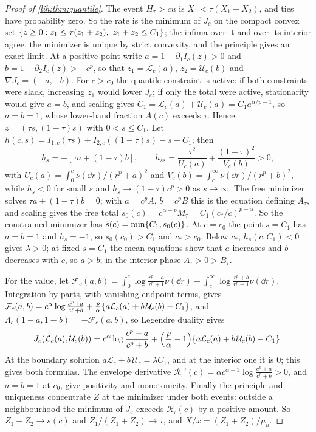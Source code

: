 \begin{proof}[Proof of \cref{lih:thm:quantile}]
The event $H_\tau>cu$ is $X_1<\tau(X_1+X_2)$, and ties have probability zero. So the rate is the minimum of
$J_c$ on the compact convex set $\{z\ge0:z_1\le\tau(z_1+z_2),\ z_1+z_2\le C_1\}$; the infima over it and over its
interior agree, the minimizer is unique by strict convexity, and the principle gives an exact limit.
At a positive point write $a=1-\partial_1I_c(z)>0$ and $b=1-\partial_2I_c(z)>-c^p$, so that $z_1=\mathcal L_c(a)$,
$z_2=\mathcal U_c(b)$ and $\nabla J_c=(-a,-b)$. For $c>c_0$ the quantile constraint is active: if both constraints were
slack, increasing $z_1$ would lower $J_c$; if only the total were active, stationarity would give $a=b$, and
scaling gives $C_1=\mathcal L_c(a)+\mathcal U_c(a)=C_1a^{\alpha/p-1}$, so $a=b=1$, whose lower-band fraction $A(c)$ exceeds $\tau$.
Hence $z=(\tau s,(1-\tau)s)$ with $0<s\le C_1$. Let $h(c,s)=I_{1,c}(\tau s)+I_{2,c}((1-\tau)s)-s+C_1$; then
\[
 h_s=-[\tau a+(1-\tau)b],\qquad h_{ss}=\frac{\tau^2}{U_c(a)}+\frac{(1-\tau)^2}{V_c(b)}>0,
\]
with $U_c(a)=\int_0^c\nu(\dd r)/(r^p+a)^2$ and $V_c(b)=\int_c^\infty\nu(\dd r)/(r^p+b)^2$, while $h_s<0$ for small $s$ and
$h_s\to(1-\tau)c^p>0$ as $s\to\infty$. The free minimizer solves $\tau a+(1-\tau)b=0$; with $a=c^pA$, $b=c^pB$ this is the
equation defining $A_\tau$, and scaling gives the free total $s_0(c)=c^{\alpha-p}M_\tau=C_1(c_*/c)^{p-\alpha}$. So the
constrained minimizer has $\bar s(c)=\min\{C_1,s_0(c)\}$. At $c=c_0$ the point $s=C_1$ has $a=b=1$ and $h_s=-1$, so
$s_0(c_0)>C_1$ and $c_*>c_0$. Below $c_*$, $h_s(c,C_1)<0$ gives $\lambda>0$; at fixed $s=C_1$ the mean equations
show that $a$ increases and $b$ decreases with $c$, so $a>b$; in the interior phase $A_\tau>0>B_\tau$.

For the value, let $\mathcal F_c(a,b)=\int_0^c\log\frac{r^p+a}{r^p+1}\nu(\dd r)+\int_c^\infty\log\frac{r^p+b}{r^p+1}\nu(\dd r)$. Integration by parts,
with vanishing endpoint terms, gives
$\mathcal F_c(a,b)=c^\alpha\log\frac{c^p+a}{c^p+b}+\frac p\alpha\{a\mathcal L_c(a)+b\,\mathcal U_c(b)-C_1\}$, and
$\Lambda_c(1-a,1-b)=-\mathcal F_c(a,b)$, so Legendre duality gives
\[
 J_c(\mathcal L_c(a),\mathcal U_c(b))=c^\alpha\log\frac{c^p+a}{c^p+b}+\Bigl(\frac p\alpha-1\Bigr)\{a\mathcal L_c(a)+b\,\mathcal U_c(b)-C_1\}.
\]
At the boundary solution $a\mathcal L_c+b\,\mathcal U_c=\lambda C_1$, and at the interior one it is $0$; this gives both formulas. The
envelope derivative $\mathcal R_\tau'(c)=\alpha c^{\alpha-1}\log\frac{c^p+a}{c^p+b}>0$, and $a=b=1$ at $c_0$, give positivity and
monotonicity. Finally the principle and uniqueness concentrate $Z$ at the minimizer under both
events: outside a neighbourhood the minimum of $J_c$ exceeds $\mathcal R_\tau(c)$ by a positive amount. So
$Z_1+Z_2\to\bar s(c)$ and $Z_1/(Z_1+Z_2)\to\tau$, and $X/x=(Z_1+Z_2)/\mu_u$.
\end{proof}

